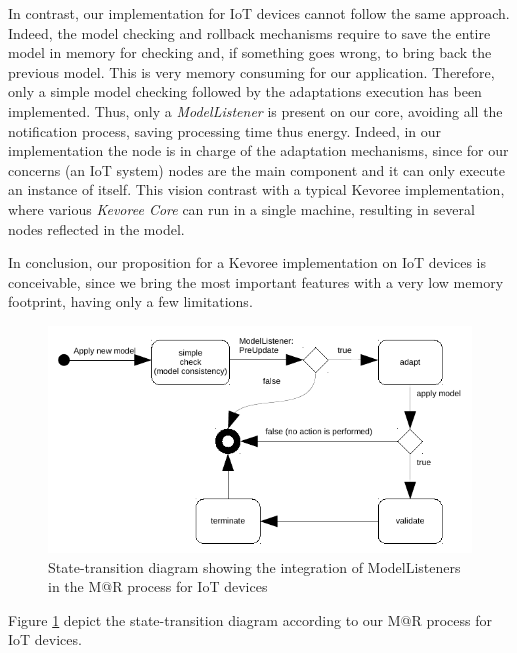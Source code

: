In contrast, our implementation for IoT devices cannot follow the same approach.
Indeed, the model checking and rollback mechanisms require to save the entire model in memory for checking and, if something goes wrong, to bring back the previous model.
This is very memory consuming for our application.
Therefore, only a simple model checking followed by the adaptations execution has been implemented.
Thus, only a \textit{ModelListener} is present on our core, avoiding all the notification process, saving processing time thus energy.
Indeed, in our implementation the node is in charge of the adaptation mechanisms, since for our concerns (an IoT system) nodes are the main component and it can only execute an instance of itself.
This vision contrast with a typical Kevoree implementation, where various \textit{Kevoree Core} can run in a single machine, resulting in several nodes reflected in the model.

In conclusion, our proposition for a Kevoree implementation on IoT devices is conceivable, since we bring the most important features with a very low memory footprint, having only a few limitations.


\begin{figure}[]
	\centering
	\includegraphics[width=0.85\columnwidth]{chapters/modelsAtRuntimeContiki.images/modelListenerIoT.pdf}
	\caption{State-transition diagram showing the integration of ModelListeners in the M@R process for IoT devices}
	\label{fig:MAR_modelListenerIoT}
\end{figure}

Figure \ref{fig:MAR_modelListenerIoT} depict the state-transition diagram according to our M@R process for IoT devices.

